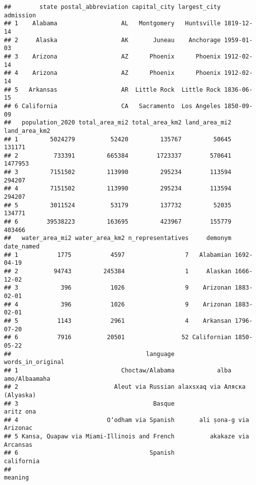 \documentclass[
]{article}
\begin{document}
\begin{verbatim}
##        state postal_abbreviation capital_city largest_city  admission
## 1    Alabama                  AL   Montgomery   Huntsville 1819-12-14
## 2     Alaska                  AK       Juneau    Anchorage 1959-01-03
## 3    Arizona                  AZ      Phoenix      Phoenix 1912-02-14
## 4    Arizona                  AZ      Phoenix      Phoenix 1912-02-14
## 5   Arkansas                  AR  Little Rock  Little Rock 1836-06-15
## 6 California                  CA   Sacramento  Los Angeles 1850-09-09
##   population_2020 total_area_mi2 total_area_km2 land_area_mi2 land_area_km2
## 1         5024279          52420         135767         50645        131171
## 2          733391         665384        1723337        570641       1477953
## 3         7151502         113990         295234        113594        294207
## 4         7151502         113990         295234        113594        294207
## 5         3011524          53179         137732         52035        134771
## 6        39538223         163695         423967        155779        403466
##   water_area_mi2 water_area_km2 n_representatives     demonym date_named
## 1           1775           4597                 7   Alabamian 1692-04-19
## 2          94743         245384                 1     Alaskan 1666-12-02
## 3            396           1026                 9    Arizonan 1883-02-01
## 4            396           1026                 9    Arizonan 1883-02-01
## 5           1143           2961                 4    Arkansan 1796-07-20
## 6           7916          20501                52 Californian 1850-05-22
##                                      language             words_in_original
## 1                             Choctaw/Alabama            alba amo/Albaamaha
## 2                           Aleut via Russian alaxsxaq via Аляска (Alyaska)
## 3                                      Basque                     aritz ona
## 4                         Oʼodham via Spanish       ali ṣona-g via Arizonac
## 5 Kansa, Quapaw via Miami-Illinois and French          akakaze via Arcansas
## 6                                     Spanish                    california
##                                                                                                                                                                                                                                                                                                                                                                                                                        meaning

\end{verbatim}
\end{document}
